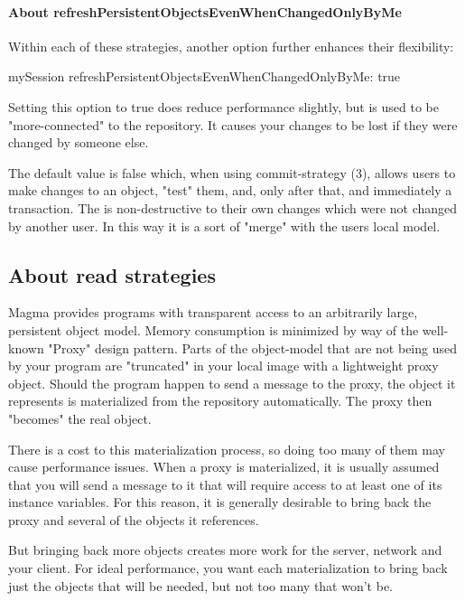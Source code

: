 \documentclass[a4paper,10pt,twoside]{book}
\begin{document}
\paragraph{About refreshPersistentObjectsEvenWhenChangedOnlyByMe}

Within each of these strategies, another option further enhances their flexibility:
\begin{code}{}
	mySession refreshPersistentObjectsEvenWhenChangedOnlyByMe: true
\end{code}

Setting this option to true does reduce performance slightly, but is used to be "more-connected" to the repository. It causes your changes to be lost if they were changed by someone else.

The default value is false which, when using commit-strategy (3), allows users to make changes to an object, "test" them, and, only after that,  and immediately  a transaction. The  is non-destructive to their own changes which were not changed by another user. In this way it is a sort of "merge" with the users local model.


\subsection{About read strategies}

Magma provides programs with transparent access to an arbitrarily large, persistent object model. Memory consumption is minimized by way of the well-known "Proxy" design pattern. Parts of the object-model that are not being used by your program are "truncated" in your local image with a lightweight proxy object. Should the program happen to send a message to the proxy, the object it represents is materialized from the repository automatically. The proxy then "becomes" the real object.

There is a cost to this materialization process, so doing too many of them may cause performance issues. When a proxy is materialized, it is usually assumed that you will send a message to it that will require access to at least one of its instance variables. For this reason, it is generally desirable to bring back the proxy and several of the objects it references.

But bringing back more objects creates more work for the server, network and your client. For ideal performance, you want each materialization to bring back just the objects that will be needed, but not too many that won't be.
\end{document}
